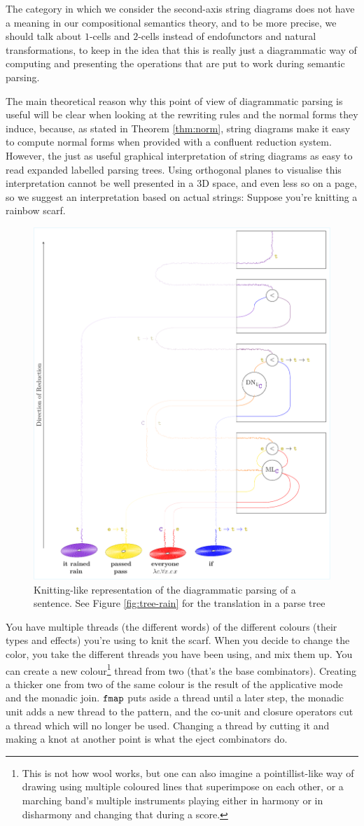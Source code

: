 The category in which we consider the second-axis string diagrams does not have
a meaning in our compositional semantics theory, and to be more precise, we
should talk about $1$-cells and $2$-cells instead of endofunctors and natural
transformations, to keep in the idea that this is really just a diagrammatic
way of computing and presenting the operations that are put to work during
semantic parsing.

The main theoretical reason why this point of view of diagrammatic parsing is
useful will be clear when looking at the rewriting rules and the normal forms
they induce, because, as stated in Theorem \ref{thm:norm}, string
diagrams make it easy to compute normal forms when provided with a confluent
reduction system.
However, the just as useful graphical interpretation of string diagrams as
easy to read expanded labelled parsing trees.
Using orthogonal planes to visualise this interpretation cannot be well
presented in a 3D space, and even less so on a page, so we suggest an
interpretation based on actual strings:
Suppose you're knitting a rainbow scarf.

\begin{figure}
	\centering
	\includegraphics[width=.5\textwidth]{3d-parsing-diagram}
	\caption{Knitting-like representation of the diagrammatic parsing of a sentence. See Figure \ref{fig:tree-rain} for the translation in a parse tree}
	\label{fig:3dparsing-diagram}
\end{figure}

You have multiple threads (the different words) of the different colours (their
types and effects) you're using to knit the scarf.
When you decide to change the color, you take the different threads you have
been using, and mix them up.
You can create a new colour\footnote{This is not how wool works, but
	one can also imagine a pointillist-like way of drawing using multiple
	coloured lines that superimpose on each other, or a marching band's multiple
	instruments playing either in harmony or in disharmony and changing that
	during a score.} thread from two (that's the base combinators).
Creating a thicker one from two of the same colour is the result of the
applicative mode and the monadic join.
$\texttt{fmap}$ puts aside a thread until a later step, the monadic unit adds a new
thread to the pattern, and the co-unit and closure operators cut a thread which
will no longer be used.
Changing a thread by cutting it and making a knot at another point is what the
eject combinators do.

